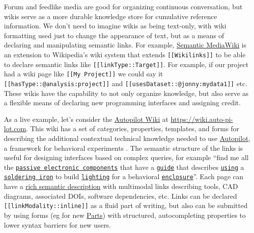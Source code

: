 \documentclass[notoc]{tufte-book}
\begin{document}
Forum and feedlike media are good for organizing continuous
conversation, but wikis serve as a more durable knowledge store for
cumulative reference information. We don't need to imagine wikis as
being text-only, with wiki formatting used just to change the appearance
of text, but as a means of declaring and manipulating semantic links.
For example,
\href{https://www.semantic-mediawiki.org/wiki/Semantic_MediaWiki}{Semantic
MediaWiki} is an extension to Wikipedia's wiki system that extends
\texttt{{[}{[}Wikilinks{]}{]}} to be able to declare semantic links like
\texttt{{[}{[}linkType::Target{]}{]}}. For example, if our project had a
wiki page like \texttt{{[}{[}My\ Project{]}{]}} we could say it
\texttt{{[}{[}hasType::@analysis:project{]}{]}} and
\texttt{{[}{[}usesDataset::@jonny:mydata1{]}{]}} etc. These wikis have
the capability to not only organize knowledge, but also serve as a
flexible means of declaring new programming interfaces and assigning
credit.

As a live example, let's consider the
\href{https://wiki.auto-pi-lot.com}{Autopilot Wiki} at
\url{https://wiki.auto-pi-lot.com}. This wiki has a set of categories,
properties, templates, and forms for describing the additional
contextual technical knowledge needed to use
\href{https://docs.auto-pi-lot.com/en/latest/}{Autopilot}, a framework
for behavioral experiments \citep{saundersAutopilotAutomatingBehavioral2019} . The semantic structure
of the links is useful for designing interfaces based on complex
queries, for example ``find me all the
\href{https://wiki.auto-pi-lot.com/index.php/Category:Passive_Component}{\texttt{passive\ electronic\ components}}
that have a
\href{https://wiki.auto-pi-lot.com/index.php/Category:Guide}{\texttt{guide}}
that describes
\href{https://wiki.auto-pi-lot.com/index.php/Property:Uses_Tool}{\texttt{using}}
a
\href{https://wiki.auto-pi-lot.com/index.php?title=Property\%3AUses+Tool\&limit=20\&offset=0\&filter=Soldering+Iron}{\texttt{soldering\ iron}}
to build
\href{https://wiki.auto-pi-lot.com/index.php?title=Property\%3AModality\&limit=20\&offset=0\&filter=Illumination}{\texttt{lighting}}
for a behavioral
\href{https://wiki.auto-pi-lot.com/index.php?title=Property\%3AModality\&limit=20\&offset=0\&filter=Enclosures}{\texttt{enclosure}}''.
Each page can have a
\href{https://wiki.auto-pi-lot.com/index.php/Autopilot_Behavior_Box\#tab-content-facts-list}{rich
semantic description} with multimodal links describing tools, CAD
diagrams, associated DOIs, software dependencies, etc. Links can be
declared \texttt{{[}{[}linkModality::inline{]}{]}} as a fluid part of
writing, but also can be submitted by using forms (eg for new
\href{https://wiki.auto-pi-lot.com/index.php/Form:Part}{Parts}) with
structured, autocompleting properties to lower syntax barriers for new
users.
\end{document}
